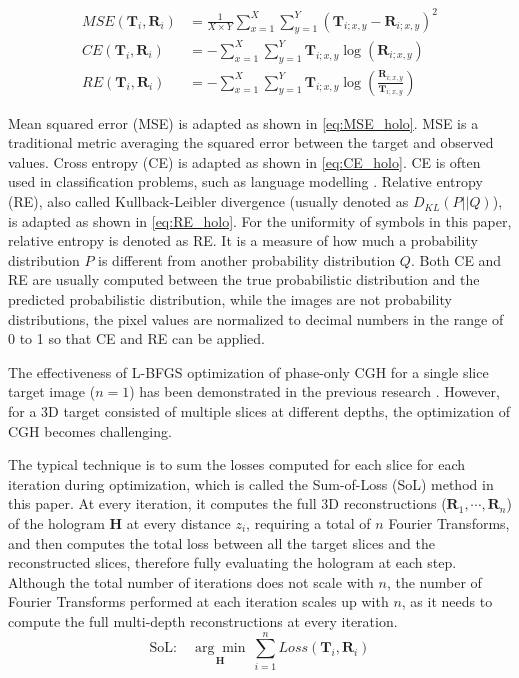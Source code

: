 \begin{align}
	MSE(\textbf{T}_i, \textbf{R}_i) & = \frac{1}{X\times Y} \sum_{x=1}^{X} \sum_{y=1}^{Y} (\textbf{T}_{i;x,y}-\textbf{R}_{i;x,y})^2\label{eq:MSE_holo}                     \\
	CE(\textbf{T}_i, \textbf{R}_i)  & = -\sum_{x=1}^{X} \sum_{y=1}^{Y} \textbf{T}_{i;x,y}\log(\textbf{R}_{i;x,y})\label{eq:CE_holo}                                        \\
	RE(\textbf{T}_i, \textbf{R}_i)  & = -\sum_{x=1}^{X} \sum_{y=1}^{Y} \textbf{T}_{i;x,y}\log\left(\frac{\textbf{R}_{i;x,y}}{\textbf{T}_{i;x,y}}\right) \label{eq:RE_holo}
\end{align}

Mean squared error (MSE) is adapted as shown in \cref{eq:MSE_holo}. MSE is a traditional metric averaging the squared error between the target and observed values. Cross entropy (CE) is adapted as shown in \cref{eq:CE_holo}. CE is often used in classification problems, such as language modelling \cite{Liu2018}. Relative entropy (RE), also called Kullback-Leibler divergence (usually denoted as $D_{KL}(P\vert\vert Q)$), is adapted as shown in \cref{eq:RE_holo}. For the uniformity of symbols in this paper, relative entropy is denoted as RE. It is a measure of how much a probability distribution $P$ is different from another probability distribution $Q$. Both CE and RE are usually computed between the true probabilistic distribution and the predicted probabilistic distribution, while the images are not probability distributions, the pixel values are normalized to decimal numbers in the range of 0 to 1 so that CE and RE can be applied.

The effectiveness of L-BFGS optimization of phase-only CGH for a single slice target image ($n=1$) has been demonstrated in the previous research \cite{Sha2022}. However, for a 3D target consisted of multiple slices at different depths, the optimization of CGH becomes challenging.

The typical technique is to sum the losses computed for each slice for each iteration during optimization, which is called the Sum-of-Loss (SoL) method in this paper. At every iteration, it computes the full 3D reconstructions ($\textbf{R}_1, \cdots, \textbf{R}_n$) of the hologram $\textbf{H}$ at every distance $z_i$, requiring a total of $n$ Fourier Transforms, and then computes the total loss between all the target slices and the reconstructed slices, therefore fully evaluating the hologram at each step. Although the total number of iterations does not scale with $n$, the number of Fourier Transforms performed at each iteration scales up with $n$, as it needs to compute the full multi-depth reconstructions at every iteration.
\begin{equation}
	\text{SoL:}\quad \underset{\textbf{H}}{\arg \min}\ \sum_{i = 1}^{n} Loss(\textbf{T}_i, \textbf{R}_i)
\end{equation}

